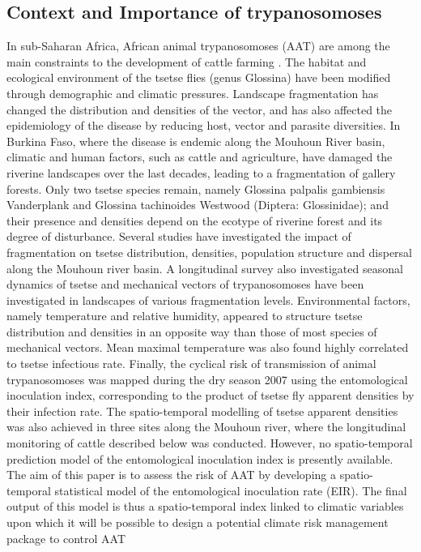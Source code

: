 \documentclass[10pt]{article}
\begin{document}
\subsection*{Context and Importance of trypanosomoses}
\label{unnumbered-3}
In sub-Saharan Africa, African animal trypanosomoses (AAT) are among the main constraints to the development of cattle farming \cite{itard2003trypanosomoses}.
The habitat and ecological environment of the tsetse flies (genus Glossina) have been modified through demographic and climatic pressures.
Landscape  fragmentation has changed the distribution and densities of the vector, and has also affected the epidemiology of the disease by reducing host, vector and parasite diversities. 
In Burkina Faso, where the disease is endemic along the Mouhoun River basin, climatic and human factors, such as cattle and agriculture, have damaged the riverine landscapes over the last decades,
leading to a fragmentation of gallery forests. Only two tsetse species remain, namely Glossina palpalis gambiensis Vanderplank and Glossina tachinoides Westwood (Diptera: Glossinidae); 
and their presence and densities depend on the ecotype of riverine forest and its degree of disturbance. Several studies have investigated the impact of fragmentation on tsetse distribution, densities, 
population structure and dispersal along the Mouhoun river basin. A longitudinal survey also investigated seasonal dynamics of tsetse and mechanical vectors of trypanosomoses have been investigated in landscapes of various fragmentation levels. 
Environmental factors, namely temperature and relative humidity, appeared to structure tsetse distribution and densities in an opposite way than those of most species of mechanical vectors. Mean maximal temperature was also found highly correlated to tsetse infectious rate. 
Finally, the cyclical risk of transmission of animal trypanosomoses was mapped during the dry season 2007 using the entomological inoculation index, corresponding to the product of tsetse fly apparent densities by  their infection rate. 
The spatio-temporal modelling of tsetse apparent densities was also achieved in three sites along the Mouhoun river, where the longitudinal monitoring of cattle described below was conducted. 
However, no spatio-temporal prediction model of the entomological inoculation index is presently available. The aim of this paper is to assess the risk of AAT  by developing a spatio-temporal statistical model of the entomological inoculation rate (EIR).  The final output of this model is thus  a spatio-temporal index linked to climatic variables upon which it will be possible to design a potential climate risk management package to control AAT
\end{document}
